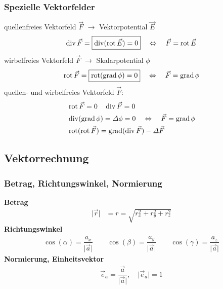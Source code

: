 \subsubsection{Spezielle Vektorfelder}
quellenfreies Vektorfeld $\vec{F}$ $\rightarrow$ Vektorpotential $\vec{E}$
\begin{align*}
\operatorname{div} \vec{F} = \boxed{\operatorname{div} (\operatorname{rot} \vec{E}) = 0} \quad \Leftrightarrow \quad  \vec{F} = \operatorname{rot} \vec{E}
\end{align*}
wirbelfreies Vektorfeld $\vec{F}$ $\rightarrow$ Skalarpotential $\phi$
\begin{align*}
    \operatorname{rot} \vec{F} = \boxed{\operatorname{rot} (\operatorname{grad} \phi) = 0} \quad \Leftrightarrow \quad  \vec{F} = \operatorname{grad} \phi
\end{align*}
quellen- und wirbelfreies Vektorfeld $\vec{F}$:
\begin{align*}
    &\operatorname{rot} \vec{F}  = 0 \quad \operatorname{div} \vec{F} = 0\\
    &\operatorname{div} (\operatorname{grad} \phi) = \varDelta \phi = 0 \quad \Leftrightarrow \quad  \vec{F} = \operatorname{grad} \phi\\
    &\operatorname{rot} (\operatorname{rot} \vec{F})  = \operatorname{grad} (\operatorname{div} \vec{F}) - \varDelta \vec{F} 
\end{align*}



\subsection{Vektorrechnung}
\subsubsection{Betrag, Richtungswinkel, Normierung}
\textbf{Betrag}
\begin{align*}
    \vert \vec{r}  \vert & = r = \sqrt{r^2_x + r^2_y + r^2_z}
\end{align*}
\textbf{Richtungswinkel}
\begin{align*}
    \cos(\alpha) = \dfrac{a_x}{\vert \vec{a} \vert} \qquad \cos(\beta) = \dfrac{a_y}{\vert \vec{a} \vert} \qquad
        \cos(\gamma) = \dfrac{a_z}{\vert \vec{a} \vert}
    \end{align*}
    \textbf{Normierung, Einheitsvektor}
    \begin{align*}
        \vec{e}_a =  \dfrac{\vec{a}}{\vert \vec{a} \vert}, \quad \vert \vec{e}_a \vert = 1
    \end{align*}
    
